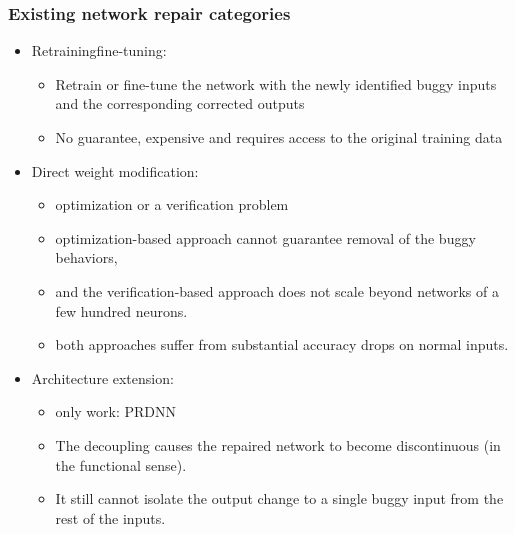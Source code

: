 \documentclass[aspectratio=169 %
,serif,mathserif]{beamer}
\begin{document}
\begin{frame}
	\frametitle{Existing network repair categories}
	\begin{itemize}
		\item Retraining\/fine-tuning:
		\begin{itemize}
			\item Retrain or fine-tune the network with the newly identified buggy inputs and the corresponding corrected outputs
			\item No guarantee, expensive and requires access to the original training data
		\end{itemize} \pause
		\item Direct weight modification:
		\begin{itemize}
			\item optimization or a verification problem
			\item optimization-based approach cannot guarantee removal of the buggy behaviors, 
			\item and the verification-based approach does not scale beyond networks of a few hundred neurons.
			\item both approaches suffer from substantial accuracy drops on normal inputs.
		\end{itemize} \pause
		\item Architecture extension:
		\begin{itemize}
			\item only work: PRDNN
			\item The decoupling causes the repaired network to become discontinuous (in the functional sense).
			\item It still cannot isolate the output change to a single buggy input from the rest of the inputs.
		\end{itemize}
	\end{itemize}
\end{frame}
\end{document}
